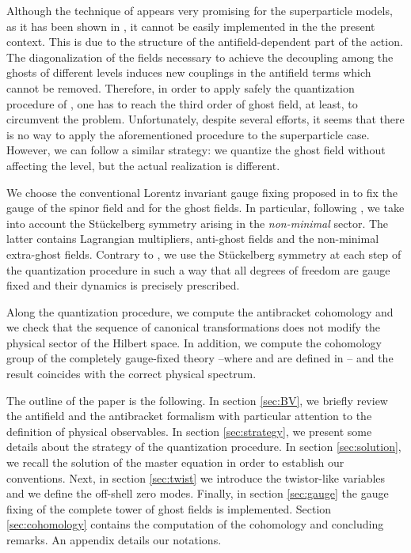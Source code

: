 \documentclass[a4paper,12pt]{article}
\begin{document}
Although the technique of \cite{GPZ} appears very promising for the
superparticle models, as it has been shown in \cite{poli_1}, it cannot
be easily implemented in the the present context. This is due to the
structure of the antifield-dependent part of the action. The
diagonalization of the fields necessary to achieve the decoupling
among the ghosts of different levels induces new couplings in the antifield
terms which cannot be removed. Therefore, in order to apply
safely the quantization procedure of \cite{poli_1,GPZ}, one has to
reach the third order of ghost field, at least, to circumvent the
problem.  Unfortunately, despite several efforts, it seems that there
is no way to apply the aforementioned procedure to the superparticle case.
However, we can follow a similar strategy: we quantize the \coordHE{}
ghost field without affecting the \coordHE{} level, but the
actual realization is different.

We choose the conventional Lorentz invariant gauge fixing proposed in
\cite{GH,kallosh,Lindstrom_BS} to fix the gauge of the spinor field
\myHighlight{$\theta_\alpha$}\coordHE{} and for the ghost fields. In particular, following
\cite{kallosh,stu}, we take into account the St\"uckelberg symmetry
arising in the {\it non-minimal} sector. The latter contains
Lagrangian multipliers, anti-ghost fields and the non-minimal
extra-ghost fields. Contrary to \cite{kallosh,kallo}, we use the
St\"uckelberg symmetry at each step of the quantization procedure in
such a way that all degrees of freedom are gauge fixed and their
dynamics is precisely prescribed.

Along the quantization procedure, we compute the antibracket
cohomology and we check that
the sequence of canonical transformations does not modify the physical
sector of the Hilbert space. In addition, we compute the cohomology
group \coordHE{} of the completely gauge-fixed theory
--where \myHighlight{$\gamma$}\coordHE{} and \myHighlight{$\delta$}\coordHE{} are defined in \cite{anti_coho,gomis}--
and the result coincides with the correct physical spectrum.

The outline of the paper is the following. In section \ref{sec:BV}, we
briefly review the antifield and the antibracket formalism with
particular attention to the definition of physical observables. In
section \ref{sec:strategy}, we present some details about the strategy
of the quantization procedure. In section \ref{sec:solution}, we recall
the solution of the master equation in order to establish our
conventions. Next, in section \ref{sec:twist} we introduce the
twistor-like variables and we define the off-shell zero modes.
Finally, in section \ref{sec:gauge} the gauge fixing of the complete
tower of ghost fields is implemented. Section \ref{sec:cohomology}
contains the computation of the cohomology and concluding remarks. An
appendix details our notations.
\end{document}
